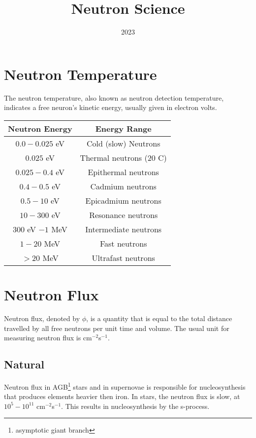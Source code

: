 \documentclass{article}
\title{Neutron Science}
\author{}
\date{2023}
\begin{document}
  \maketitle
  \begin{multicols*}{2}
    \section{Neutron Temperature}
    The neutron temperature, also known as neutron detection temperature,
    indicates a free neuron's kinetic energy, usually given in electron volts.\\
    
    \begin{tabular}{|c|c|}
      \hline
      \textbf{Neutron Energy} & \textbf{Energy Range} \\
      \hline
      $0.0 - 0.025$ eV & Cold (slow) Neutrons \\
      $0.025$ eV & Thermal neutrons ($20$ C) \\
      $0.025-0.4$ eV & Epithermal neutrons \\
      $0.4-0.5$ eV & Cadmium neutrons \\
      $0.5-10$ eV & Epicadmium neutrons \\
      $10-300$ eV & Resonance neutrons \\
      $300$ eV $- 1$ MeV & Intermediate neutrons \\
      $1-20$ MeV & Fast neutrons \\
      $> 20$ MeV & Ultrafast neutrons \\
      \hline
    \end{tabular}
    \section{Neutron Flux}
    Neutron flux, denoted by $\phi$, is a quantity that is equal to the total
    distance travelled by all free neutrons per unit time and volume. The usual
    unit for measuring neutron flux is cm$^{-2}$s$^{-1}$.
    \subsection{Natural}
    Neutron flux in AGB\footnote{asymptotic giant branch} stars and in supernovae
    is responsible for nucleosynthesis that produces elements heavier then iron.
    In stars, the neutron flux is slow, at $10^{5} - 10^{11}$ cm$^{-2}$s$^{-1}$.
    This results in nucleosynthesis by the s-process.


\end{multicols*}
\end{document}
